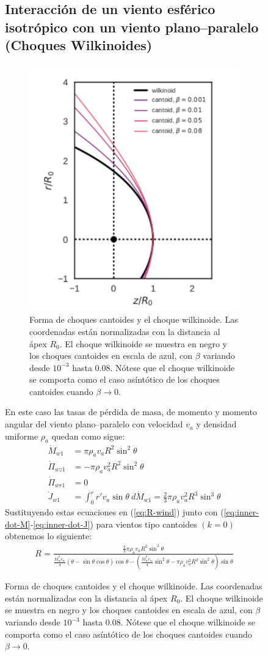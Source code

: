 \begin{figure}
\subsection{Interacción de un viento esférico isotrópico con un viento plano--paralelo (Choques Wilkinoides)}
\label{sec:wilkinoids}
\begin{figure}
  \centering
  \includegraphics[width=0.43\linewidth]{./Figures/cantoid-wilkinoid-shape}
  \caption{Forma de choques cantoides y el choque wilkinoide. Las coordenadas están normalizadas con la distancia al ápex $R_0$. El choque wilkinoide se muestra en negro y los choques cantoides en escala de azul, con $\beta$ variando desde $10^{-3}$ hasta 0.08. Nótese que el choque wilkinoide se comporta como el caso asíntótico de los choques cantoides cuando $\beta\to 0$.}
 \label{fig:wilkinoid-solution} 
\end{figure}
En este caso las tasas de pérdida de masa, de momento y momento angular del viento plano--paralelo con velocidad $v_a$ y densidad uniforme $\rho_a$ quedan como sigue:
\begin{align}
  \dot{M}_{w1} &= \pi \rho_a v_a R^2 \sin^2\theta \label{eq:w-dotm}\\
  \dot{\Pi}_{wz1} &= - \pi\rho_a v^2_a R^2 \sin^2\theta\\
  \dot{\Pi}_{wr1} &= 0 \\
  \dot{J}_{w1} &= \int^r_0 r'v_a \sin\theta~d\dot{M}_{w1} = \frac{2}{3}\pi\rho_a v_a^2 R^3 \sin^3\theta \label{eq:w-jw1} 
\end{align}
Sustituyendo estas ecuaciones en (\ref{eq:R-wind}) junto con (\ref{eq:inner-dot-M}-\ref{eq:inner-dot-J}) para vientos tipo cantoides $(k=0)$ obtenemos lo siguiente:
\small
\begin{align}
  R = \frac{\frac{2}{3}\pi\rho_a v_a R^3 \sin^3\theta}{\frac{\dot{M}^0_w v_w}{4}\left(\theta-\sin\theta\cos\theta\right)\cos\theta
  - \left(\frac{\dot{M}^0_w v_w}{4}\sin^2\theta - \pi\rho_a v^2_a R^2 \sin^2\theta\right)\sin\theta}

\end{align}
\end{figure}
